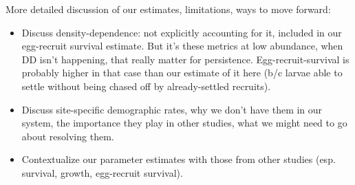\documentclass[12pt, oneside]{article}   	%
\begin{document}
More detailed discussion of our estimates, limitations, ways to move forward:
\begin{itemize}
	\item Discuss density-dependence: not explicitly accounting for it, included in our egg-recruit survival estimate. But it's these metrics at low abundance, when DD isn't happening, that really matter for persistence. Egg-recruit-survival is probably higher in that case than our estimate of it here (b/c larvae able to settle without being chased off by already-settled recruits).
	\item Discuss site-specific demographic rates, why we don't have them in our system, the importance they play in other studies, what we might need to go about resolving them.
	\item Contextualize our parameter estimates with those from other studies (esp. survival, growth, egg-recruit survival).

\end{itemize}
\end{document}
